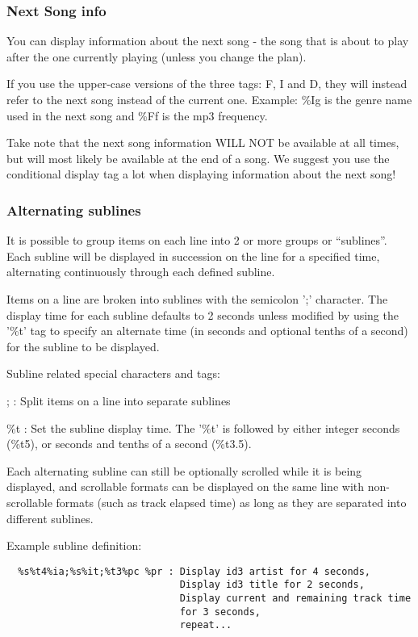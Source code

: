 \subsubsection{Next Song info}
You can display information about the next song {}- the song that is
about to play after the one currently playing (unless you change the
plan).

If you use the upper{}-case versions of the
three tags: F, I and D, they will instead refer to the next song
instead of the current one. Example: \%Ig is the genre name used in the
next song and \%Ff is the mp3 frequency. 

Take note that the next song information WILL NOT be available at all
times, but will most likely be available at the end of a song. We
suggest you use the conditional display tag a lot when displaying
information about the next song! 

\subsubsection{Alternating sublines}

It is possible to group items on each line into 2 or more groups or
``sublines''. Each subline will be displayed
in succession on the line for a specified time, alternating
continuously through each defined subline. 

Items on a line are broken into sublines with the semicolon
';' character. The display time for
each subline defaults to 2 seconds unless modified by using the
'\%t' tag to specify an alternate
time (in seconds and optional tenths of a second) for the subline to be
displayed. 

Subline related special characters and tags: 

;  : Split items on a line into separate sublines

\%t  : Set the subline display time. The
'\%t' is followed by either integer
seconds (\%t5), or seconds and tenths of a second (\%t3.5).

Each alternating subline can still be optionally scrolled while it is
being displayed, and scrollable formats can be displayed on the same
line with non{}-scrollable formats (such as track elapsed time) as long
as they are separated into different sublines.

Example subline definition:

\begin{verbatim}
  %s%t4%ia;%s%it;%t3%pc %pr : Display id3 artist for 4 seconds,
                              Display id3 title for 2 seconds,
                              Display current and remaining track time
                              for 3 seconds,
                              repeat...
\end{verbatim}

